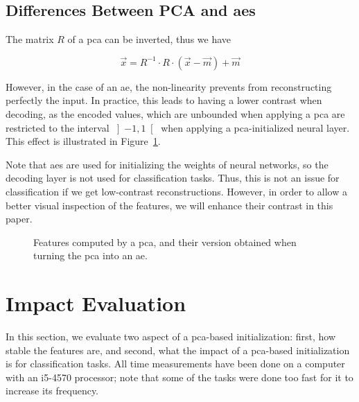 \documentclass[conference]{IEEEtran}
\begin{document}
\subsection{Differences Between PCA and \acp{ae}}
\label{sct:diff}
The matrix $R$ of a \ac{pca} can be inverted, thus we have

\begin{equation}
  \vec{x} = R^{-1} \cdot R\cdot \left(\vec{x}-\vec{m}\right) + \vec{m}
\end{equation}

However, in the case of an \ac{ae}, the non-linearity prevents from reconstructing perfectly the input.
In practice, this leads to having a lower contrast when decoding, as the encoded values, which are unbounded when applying a \ac{pca} are restricted to the interval $\left]-1, 1\right[$ when applying a \ac{pca}-initialized neural layer.
This effect is illustrated in Figure~\ref{fig:pca-vs-nn}.

Note that \acp{ae} are used for initializing the weights of neural networks, so the decoding layer is not used for classification tasks.
Thus, this is not an issue for classification if we get low-contrast reconstructions.
However, in order to allow a better visual inspection of the features, we will enhance their contrast in this paper.

\begin{figure}[ht]
  \centering
  \hfill
  \caption{
    Features computed by a \ac{pca}, and their version obtained when turning the \ac{pca} into an \ac{ae}.
  }
  \label{fig:pca-vs-nn}
\end{figure}


\section{Impact Evaluation}\label{sct:experiments}
In this section, we evaluate two aspect of a \ac{pca}-based initialization: first, how stable the features are, and second, what the impact of a \ac{pca}-based initialization is for classification tasks.
All time measurements have been done on a computer with an i5-4570 processor; note that some of the tasks were done too fast for it to increase its frequency.
\end{document}
